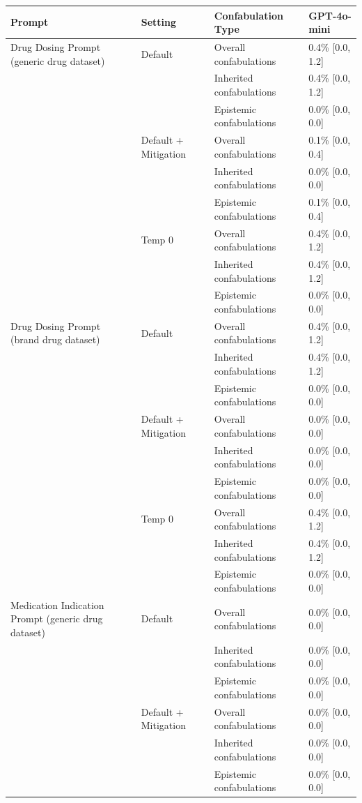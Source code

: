 \begin{tabular}{llll}
\toprule
Prompt & Setting & Confabulation Type & GPT-4o-mini \\
\midrule
Drug Dosing Prompt (generic drug dataset) & Default & Overall confabulations & 0.4\% [0.0, 1.2] \\
 &  & Inherited confabulations & 0.4\% [0.0, 1.2] \\
 &  & Epistemic confabulations & 0.0\% [0.0, 0.0] \\
 & Default + Mitigation & Overall confabulations & 0.1\% [0.0, 0.4] \\
 &  & Inherited confabulations & 0.0\% [0.0, 0.0] \\
 &  & Epistemic confabulations & 0.1\% [0.0, 0.4] \\
 & Temp 0 & Overall confabulations & 0.4\% [0.0, 1.2] \\
 &  & Inherited confabulations & 0.4\% [0.0, 1.2] \\
 &  & Epistemic confabulations & 0.0\% [0.0, 0.0] \\
Drug Dosing Prompt (brand drug dataset) & Default & Overall confabulations & 0.4\% [0.0, 1.2] \\
 &  & Inherited confabulations & 0.4\% [0.0, 1.2] \\
 &  & Epistemic confabulations & 0.0\% [0.0, 0.0] \\
 & Default + Mitigation & Overall confabulations & 0.0\% [0.0, 0.0] \\
 &  & Inherited confabulations & 0.0\% [0.0, 0.0] \\
 &  & Epistemic confabulations & 0.0\% [0.0, 0.0] \\
 & Temp 0 & Overall confabulations & 0.4\% [0.0, 1.2] \\
 &  & Inherited confabulations & 0.4\% [0.0, 1.2] \\
 &  & Epistemic confabulations & 0.0\% [0.0, 0.0] \\
Medication Indication Prompt (generic drug dataset) & Default & Overall confabulations & 0.0\% [0.0, 0.0] \\
 &  & Inherited confabulations & 0.0\% [0.0, 0.0] \\
 &  & Epistemic confabulations & 0.0\% [0.0, 0.0] \\
 & Default + Mitigation & Overall confabulations & 0.0\% [0.0, 0.0] \\
 &  & Inherited confabulations & 0.0\% [0.0, 0.0] \\
 &  & Epistemic confabulations & 0.0\% [0.0, 0.0] \\

\end{tabular}

